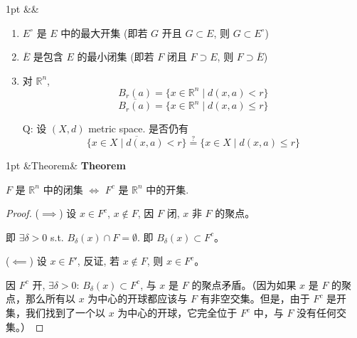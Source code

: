 \documentclass[a4paper]{article}
\newenvironment{problem}[1][]{%
\def\FrameCommand{%
\hspace{1pt}%
{\color{problemline}\vrule width 2pt}%
{\color{problemshade}\vrule width 4pt}%
\colorbox{problemshade}%
}%
\MakeFramed{\advance\hsize-\width\FrameRestore}%
\noindent
\hspace{-4.55pt}%
\begin{adjustwidth}{}{1pt}%
\setlength{\parindent}{0pt}%
\vspace{3pt}%
\ifx&#1&\else %
\textbf{#1}\par
\vspace{1pt}%
\fi }{%
\vspace{2pt}%
\end{adjustwidth}\endMakeFramed%
}
\newenvironment{theorem}[1][]{%
\def\FrameCommand{%
\hspace{1pt}%
{\color{theoremline}\vrule width 2pt}%
{\color{theoremshade}\vrule width 4pt}%
\colorbox{theoremshade}%
}%
\MakeFramed{\advance\hsize-\width\FrameRestore}%
\noindent
\hspace{-4.55pt}%
\begin{adjustwidth}{}{1pt}%
\setlength{\parindent}{0pt}%
\vspace{3pt}%
\ifx&#1&\else %
\textbf{#1}\par
\vspace{1pt}%
\fi }{%
\vspace{2pt}%
\end{adjustwidth}\endMakeFramed%
}
\begin{document}
    \begin{problem}
        [思考题：证明]
        \begin{enumerate}
            \item $E^{\circ}$ 是 $E$ 中的最大开集 (即若 $G$ 开且 $G \subset E$, 则
                $G \subset E^{\circ}$)

            \item $\overline{E}$ 是包含 $E$ 的最小闭集 (即若 $F$ 闭且
                $F \supset E$, 则 $F \supset \overline{E}$)

            \item 对 $\mathbb{R}^{n}$,
                \[
                    B_{r}(a) = \{x \in \mathbb{R}^{n}\mid d(x, a) < r\}
                \]
                \[
                    \overline{B_r(a)}= \{x \in \mathbb{R}^{n}\mid d(x, a) \leq r
                    \}
                \]

                Q: 设 $(X, d)$ metric space. 是否仍有
                \[
                    \overline{\{x \in X \mid d(x, a) < r\}}\stackrel{?}{=}\{x \in
                    X \mid d(x, a) \leq r\}
                \]
        \end{enumerate}
    \end{problem}

    \begin{theorem}[Theorem]
        $F$ 是 $\mathbb{R}^{n}$ 中的闭集 $\iff$ $F^{c}$ 是 $\mathbb{R}^{n}$ 中的开集.
    \end{theorem}

    \begin{proof}[Proof]
        ($\implies$) 设 $x \in F^{c}$, $x \notin F$, 因 $F$ 闭, $x$ 非 $F$
        的聚点。

        即 $\exists \delta > 0$ s.t. $B_{\delta}(x) \cap F = \emptyset$. 即 $B_{\delta}
        (x) \subset F^{c}$。

        ($\impliedby$) 设 $x \in F'$, 反证, 若 $x \notin F$, 则 $x \in F^{c}$。

        因 $F^{c}$ 开, $\exists \delta > 0$: $B_{\delta}(x) \subset F^{c}$, 与 $x$
        是 $F$ 的聚点矛盾。（因为如果 $x$ 是 $F$ 的聚点，那么所有以 $x$ 为中心的开球都应该与
        $F$ 有非空交集。但是，由于 $F^{c}$ 是开集，我们找到了一个以 $x$ 为中心的开球，它完全位于
        $F^{c}$ 中，与 $F$ 没有任何交集。）
    \end{proof}
\end{document}
